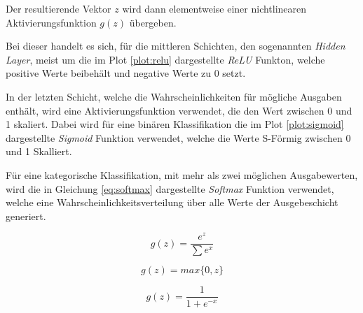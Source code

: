 Der resultierende Vektor $z$ wird dann elementweise
einer nichtlinearen Aktivierungsfunktion $g(z)$ übergeben.

Bei dieser handelt es sich, für die mittleren Schichten, 
den sogenannten \textit{Hidden Layer},  
meist um die im Plot \ref{plot:relu} dargestellte \textit{ReLU} Funkton,
welche positive Werte beibehält und negative 
Werte zu 0 setzt.

In der letzten Schicht, welche die Wahrscheinlichkeiten 
für mögliche Ausgaben enthält, wird eine Aktivierungsfunktion
verwendet, die den Wert zwischen 0 und 1 
skaliert.
Dabei wird für eine binären Klassifikation die 
im Plot \ref{plot:sigmoid} dargestellte \textit{Sigmoid} 
Funktion verwendet, welche die Werte S-Förmig zwischen 
0 und 1 Skalliert.

Für eine kategorische Klassifikation, 
mit mehr als zwei möglichen Ausgabewerten, 
wird die in Gleichung 
\ref{eq:softmax} dargestellte \textit{Softmax} Funktion 
verwendet, welche 
eine Wahrscheinlichkeitsverteilung
über alle Werte der Ausgebeschicht generiert.

\begin{equation}
    \label{eq:softmax}
    g(z) = \frac{e^{z}}{\sum e^{x}}
\end{equation}
\newpage
\begin{minipage}{0.5\textwidth}
    \centering
    \begin{equation*}
        \label{eq:relu}
        g(z) = max\{0,z\}
    \end{equation*}
\end{minipage}
\vspace{1cm}
\begin{minipage}{0.5\textwidth}
    \centering
    \begin{equation*}
        \label{eq:sidmoid}
        g(z) = \frac{1}{1 + e^{-x}}
    \end{equation*}    
\end{minipage}
\begin{minipage}{0.5\textwidth}
    \centering
    
    \label{plot:relu}
\end{minipage}
\begin{minipage}{0.5\textwidth}
    \centering
    
    \label{plot:sigmoid}
\end{minipage}
\vspace{1cm}



